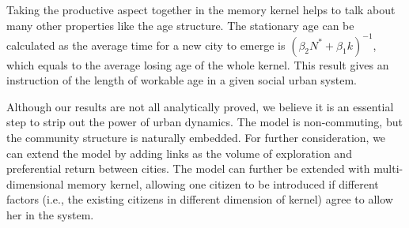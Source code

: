 \documentclass[reprint,unsortedaddress,amsmath,amssymb,aps,prl,showkeys]{revtex4-2}
\begin{document}
Taking the productive aspect together in the memory kernel helps to talk about many other properties like the age structure. The stationary age can be calculated as the average time for a new city to emerge is $(\beta_2 N^* + \beta_1 k)^{-1}$, which equals to the average losing age of the whole kernel. This result gives an instruction of the length of workable age in a given social urban system.

Although our results are not all analytically proved, we believe it is an essential step to strip out the power of urban dynamics. The model is non-commuting, but the community structure is naturally embedded. For further consideration, we can extend the model by adding links as the volume of exploration and preferential return between cities\cite{WANG2019121921}. The model can further be extended with multi-dimensional memory kernel, allowing one citizen to be introduced if different factors\cite{tokita2020social} (i.e., the existing citizens in different dimension of kernel) agree to allow her in the system.




\end{document}
